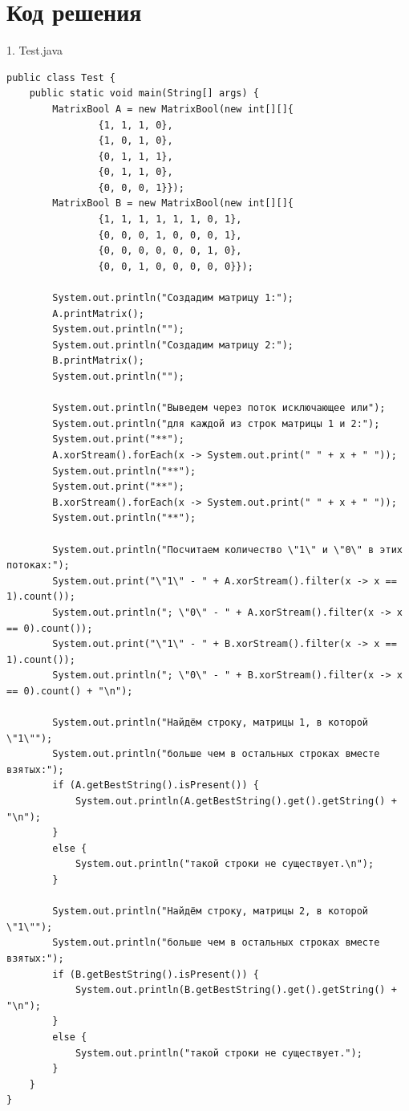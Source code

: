 ﻿\documentclass[a4paper, 12pt]{extarticle}
\begin{document}
\section{Код решения}
1. Test.java
\begin{verbatim}
public class Test {
    public static void main(String[] args) {
        MatrixBool A = new MatrixBool(new int[][]{
                {1, 1, 1, 0},
                {1, 0, 1, 0},
                {0, 1, 1, 1},
                {0, 1, 1, 0},
                {0, 0, 0, 1}});
        MatrixBool B = new MatrixBool(new int[][]{
                {1, 1, 1, 1, 1, 1, 0, 1},
                {0, 0, 0, 1, 0, 0, 0, 1},
                {0, 0, 0, 0, 0, 0, 1, 0},
                {0, 0, 1, 0, 0, 0, 0, 0}});

        System.out.println("Создадим матрицу 1:");
        A.printMatrix();
        System.out.println("");
        System.out.println("Создадим матрицу 2:");
        B.printMatrix();
        System.out.println("");

        System.out.println("Выведем через поток исключающее или");
        System.out.println("для каждой из строк матрицы 1 и 2:");
        System.out.print("**");
        A.xorStream().forEach(x -> System.out.print(" " + x + " "));
        System.out.println("**");
        System.out.print("**");
        B.xorStream().forEach(x -> System.out.print(" " + x + " "));
        System.out.println("**");

        System.out.println("Посчитаем количество \"1\" и \"0\" в этих потоках:");
        System.out.print("\"1\" - " + A.xorStream().filter(x -> x == 1).count());
        System.out.println("; \"0\" - " + A.xorStream().filter(x -> x == 0).count());
        System.out.print("\"1\" - " + B.xorStream().filter(x -> x == 1).count());
        System.out.println("; \"0\" - " + B.xorStream().filter(x -> x == 0).count() + "\n");

        System.out.println("Найдём строку, матрицы 1, в которой \"1\"");
        System.out.println("больше чем в остальных строках вместе взятых:");
        if (A.getBestString().isPresent()) {
            System.out.println(A.getBestString().get().getString() + "\n");
        }
        else {
            System.out.println("такой строки не существует.\n");
        }

        System.out.println("Найдём строку, матрицы 2, в которой \"1\"");
        System.out.println("больше чем в остальных строках вместе взятых:");
        if (B.getBestString().isPresent()) {
            System.out.println(B.getBestString().get().getString() + "\n");
        }
        else {
            System.out.println("такой строки не существует.");
        }
    }
}
\end{verbatim}
\end{document}
